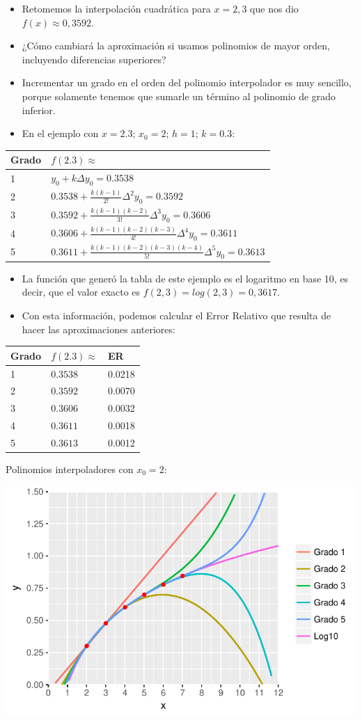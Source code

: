 \documentclass[]{book}
\providecommand{\tightlist}{%
  \setlength{\itemsep}{0pt}\setlength{\parskip}{0pt}}
\begin{document}
\begin{itemize}
\tightlist
\item
  Retomemos la interpolación cuadrática para \(x=2,3\) que nos dio \(f(x) \approx 0,3592\).
\item
  ¿Cómo cambiará la aproximación si usamos polinomios de mayor orden, incluyendo diferencias superiores?
\item
  Incrementar un grado en el orden del polinomio interpolador es muy sencillo, porque solamente tenemos que sumarle un término al polinomio de grado inferior.
\item
  En el ejemplo con \(x = 2.3\); \(x_0=2\); \(h = 1\); \(k = 0.3\):
\end{itemize}

\begin{longtable}[]{@{}ll@{}}
\toprule
Grado & \(f(2.3) \approx\)\tabularnewline
\midrule
\endhead
1 & \(y_0 + k \Delta y_0 = 0.3538\)\tabularnewline
2 & \(0.3538 + \frac{k(k-1)}{2!}\Delta^2 y_0 = 0.3592\)\tabularnewline
3 & \(0.3592 + \frac{k(k-1)(k-2)}{3!}\Delta^3 y_0 = 0.3606\)\tabularnewline
4 & \(0.3606 + \frac{k(k-1)(k-2)(k-3)}{4!}\Delta^4 y_0 = 0.3611\)\tabularnewline
5 & \(0.3611 + \frac{k(k-1)(k-2)(k-3)(k-4)}{5!}\Delta^5 y_0 = 0.3613\)\tabularnewline
\bottomrule
\end{longtable}

\begin{itemize}
\tightlist
\item
  La función que generó la tabla de este ejemplo es el logaritmo en base 10, es decir, que el valor exacto es \(f(2,3) = log(2,3) = 0,3617\).
\item
  Con esta información, podemos calcular el Error Relativo que resulta de hacer las aproximaciones anteriores:
\end{itemize}

\begin{longtable}[]{@{}lll@{}}
\toprule
Grado & \(f(2.3) \approx\) & ER\tabularnewline
\midrule
\endhead
1 & \(0.3538\) & 0.0218\tabularnewline
2 & \(0.3592\) & 0.0070\tabularnewline
3 & \(0.3606\) & 0.0032\tabularnewline
4 & \(0.3611\) & 0.0018\tabularnewline
5 & \(0.3613\) & 0.0012\tabularnewline
\bottomrule
\end{longtable}

Polinomios interpoladores con \(x_0=2\):

\begin{center}\includegraphics[width=0.9\linewidth]{Plots/U4/Unidad4_g4} \end{center}
\end{document}

